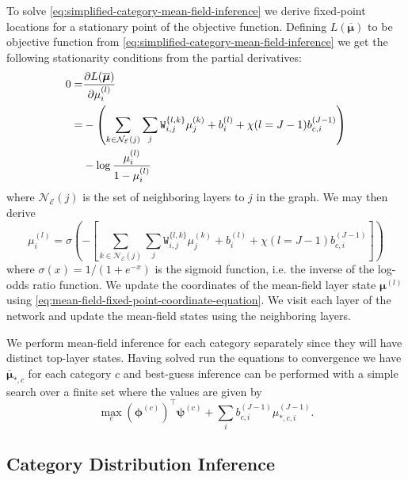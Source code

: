 \documentclass{article} %
\begin{document}
To solve \autoref{eq:simplified-category-mean-field-inference} we derive fixed-point locations for a stationary point of the objective function. 
Defining $L(\overline{\boldsymbol{\mu}})$ to be objective function from \autoref{eq:simplified-category-mean-field-inference}
we get the following stationarity conditions from the partial derivatives:
\begin{align}
0 =& \frac{\partial L(\overline{\boldsymbol{\mu}})}{\partial\mu_i^{(l)}} \notag\\
=& - \left(\sum_{k\in \mathcal{N}_{\mathcal{E}}(j)} \sum_j \mathtt{W}_{i,j}^{\{l,k\}} \mu_j^{(k)} + b_i^{(l)} + \chi(l=J-1)b_{c,i}^{(J-1)}\right)\notag\\
& - \log \frac{\mu_i^{(l)}}{1-\mu_i^{(l)}}
\end{align}
where $\mathcal{N}_{\mathcal{E}}(j)$ is the set of neighboring layers to $j$ in the graph.  We may then derive
\begin{equation}\label{eq:mean-field-fixed-point-coordinate-equation}
\mu_i^{(l)} = \sigma\left(-\left[\sum_{k\in \mathcal{N}_{\mathcal{E}}(j)} \sum_j \mathtt{W}_{i,j}^{\{l,k\}} \mu_j^{(k)} + b_i^{(l)} + \chi(l=J-1)b_{c,i}^{(J-1)}\right]\right)
\end{equation}
where $\sigma(x) = 1/(1+e^{-x})$ is the sigmoid function, i.e. the inverse of the log-odds ratio function. We update the coordinates of
the mean-field layer state $\boldsymbol{\mu}^{(l)}$ using \autoref{eq:mean-field-fixed-point-coordinate-equation}.  We visit each layer
of the network and update the mean-field states using the neighboring layers.

We perform mean-field inference for each category separately since they will have
distinct top-layer states.  Having solved run the equations to convergence we have $\overline{\boldsymbol{\mu}}_{*,c}$ for each category
$c$ and best-guess inference can be performed with a simple search over a finite set where the values are given by
\begin{equation}\label{eq:simplest-best-guess-mean-field-inference}
\max_c \left(\boldsymbol{\phi}^{(c)}\right)^\top \boldsymbol{\psi}^{(c)} + \sum_i b_{c,i}^{(J-1)} \mu_{*,c,i}^{(J-1)}.
\end{equation}

\subsection{Category Distribution Inference}
\end{document}
